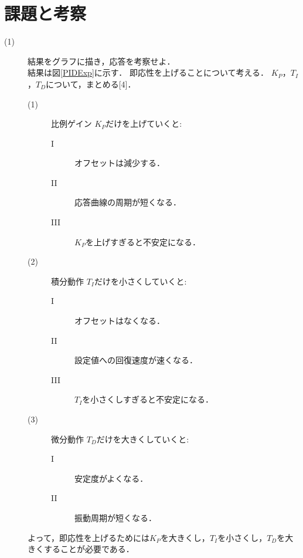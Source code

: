 \documentclass[12pt]{jsarticle}
\begin{document}
\section{課題と考察}
\begin{description}
\item[(1)]結果をグラフに描き，応答を考察せよ．\\

結果は図\ref{PIDExp}に示す．
即応性を上げることについて考える．
$K_P$，$T_I$，$T_D$について，まとめる[4]．
\begin{description}
\item[(1)] 比例ゲイン
  $K_P$だけを上げていくと:
  \begin{description}
  \item[I] オフセットは減少する．
  \item[II] 応答曲線の周期が短くなる．
  \item[III] $K_P$を上げすぎると不安定になる．
  \end{description}
\item[(2)] 積分動作
  $T_I$だけを小さくしていくと:
  \begin{description}
  \item[I] オフセットはなくなる．
  \item[II] 設定値への回復速度が速くなる．
  \item[III] $T_I$を小さくしすぎると不安定になる．
  \end{description}
\item[(3)] 微分動作
  $T_D$だけを大きくしていくと:
  \begin{description}
  \item[I] 安定度がよくなる．
  \item[II] 振動周期が短くなる．
  \end{description}
\end{description}
よって，即応性を上げるためには$K_P$を大きくし，$T_I$を小さくし，$T_D$を大きくすることが必要である．


\end{description}
\end{document}
